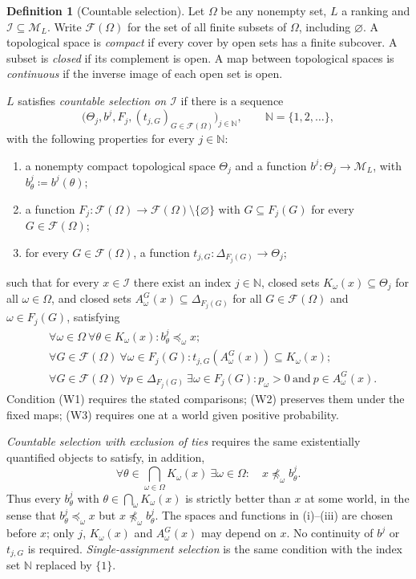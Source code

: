 \documentclass[11pt]{article}
\theoremstyle{definition}
\newtheorem{definition}[theorem]{Definition}
\theoremstyle{remark}
\newcommand{\M}{\mathcal M}
\newcommand{\I}{\mathcal I}
\begin{document}
\begin{definition}[Countable selection]\label{def:selection}\label{def:family}
{\color{red}Let $\Omega$ be any nonempty set,} $L$ a ranking and $\I\subseteq\M_L$. Write $\mathcal F(\Omega)$ for the set of all finite subsets of $\Omega$, including $\varnothing$. A topological space is \emph{compact} if every cover by open sets has a finite subcover. A subset is \emph{closed} if its complement is open. A map between topological spaces is \emph{continuous} if the inverse image of each open set is open.

$L$ satisfies \emph{countable selection on $\I$} if there is a sequence
\[
\bigl(\Theta_j,b^j,F_j,(t_{j,G})_{G\in\mathcal F(\Omega)}\bigr)_{j\in\mathbb N},\qquad \mathbb N=\{1,2,\ldots\},
\]
with the following properties for every $j\in\mathbb N$:
\begin{enumerate}[label=(\roman*)]
\item a nonempty compact topological space $\Theta_j$ and a function $b^j:\Theta_j\to\M_L$, with $b^j_\theta\coloneqq b^j(\theta)$;
\item a function $F_j:\mathcal F(\Omega)\to\mathcal F(\Omega)\setminus\{\varnothing\}$ with $G\subseteq F_j(G)$ for every $G\in\mathcal F(\Omega)$;
\item for every $G\in\mathcal F(\Omega)$, a function $t_{j,G}:\Delta_{F_j(G)}\to\Theta_j$;
\end{enumerate}
such that for every $x\in\I$ there exist an index $j\in\mathbb N$, closed sets $K_\omega(x)\subseteq\Theta_j$ for all $\omega\in\Omega$, and closed sets $A^G_\omega(x)\subseteq\Delta_{F_j(G)}$ for all $G\in\mathcal F(\Omega)$ and $\omega\in F_j(G)$, satisfying
\begin{align}
&\forall\omega\in\Omega\ \forall\theta\in K_\omega(x):
 b^j_\theta\preceq_\omega x;\tag{W1}\label{eq:comparison}\\
&\forall G\in\mathcal F(\Omega)\ \forall\omega\in F_j(G):
 t_{j,G}(A^G_\omega(x))\subseteq K_\omega(x);\tag{W2}\label{eq:compatibility}\\
&\forall G\in\mathcal F(\Omega)\ \forall p\in\Delta_{F_j(G)}\
 \exists\omega\in F_j(G):
 p_\omega>0\ \text{and}\ p\in A^G_\omega(x).\tag{W3}\label{eq:support}
\end{align}
Condition (W1) requires the stated comparisons; (W2) preserves them under the fixed maps; (W3) requires one at a world given positive probability.

\emph{Countable selection with exclusion of ties} requires the same existentially quantified objects to satisfy, in addition,
\[
\forall\theta\in\bigcap_{\omega\in\Omega}K_\omega(x)\
\exists\omega\in\Omega:\quad x\not\preceq_\omega b^j_\theta.
\tag{W4}\label{eq:notie}
\]
Thus every $b^j_\theta$ with $\theta\in\bigcap_\omega K_\omega(x)$ is strictly better than $x$ at some world, in the sense that $b^j_\theta\preceq_\omega x$ but $x\not\preceq_\omega b^j_\theta$. The spaces and functions in (i)--(iii) are chosen before $x$; only $j$, $K_\omega(x)$ and $A^G_\omega(x)$ may depend on $x$. No continuity of $b^j$ or $t_{j,G}$ is required. \emph{Single-assignment selection} is the same condition with the index set $\mathbb N$ replaced by $\{1\}$.
\end{definition}
\end{document}
